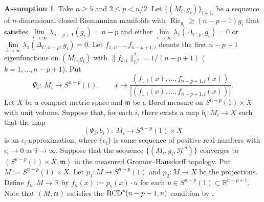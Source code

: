 \documentclass[pdftex]{sigma}
\numberwithin{equation}{section}
\theoremstyle{definition}
\newtheorem{Asu}[Thm]{Assumption}
\newcommand{\Ric}{\operatorname{Ric}}
\newcommand{\R}{\mathbb{R}}
\newcommand{\mf}{\mathfrak{m}}
\newcommand{\RCD}{{\rm RCD}^\ast}
\newcommand{\nHa}{\underline{\mathcal{H}}}
\begin{document}
\begin{Asu}\label{convX}
Take $n\geq 5$ and $2\leq p < n/2$.
Let $\{(M_i,g_i)\}_{i\in\mathbb{N}}$ be a sequence of $n$-dimen\-sional closed Riemannian manifolds with $\Ric_{g_i}\geq (n-p-1)g_i$ that satisfies $\lim\limits_{i\to\infty}\lambda_{n-p+1}(g_i)=n-p$ and either $\lim\limits_{i\to \infty}\lambda_1(\Delta_{C,p},g_i)=0$ or $\lim\limits_{i\to \infty}\lambda_1(\Delta_{C,n-p},g_i)=0$.
Let $f_{1,i},\ldots,f_{n-p+1,i}$ denote the first $n-p+1$ eigenfunctions on $(M_i,g_i)$ with $\|f_{k,i}\|_{L^2}^2=1/(n-p+1)$ ($k=1,\ldots,n-p+1$).
Put
\[
\Psi_i\colon\  M_i\to S^{n-p}(1),\qquad
x\mapsto \frac{(f_{1,i}(x),\ldots,f_{n-p+1,i}(x))}{|(f_{1,i}(x),\ldots,f_{n-p+1,i}(x))|}.
\]
Let $X$ be a compact metric space and $\mf$ be a Borel measure on $S^{n-p}(1)\times X$
with unit volume.
Suppose that, for each $i$, there exists a map $b_i\colon M_i\to X$ such that
the map
\[
(\Psi_i,b_i)\colon\ M_i\to S^{n-p}(1)\times X
\]
is an $\epsilon_i$-approximation, where $\{\epsilon_i\}$ is some sequence of positive real numbers with $\epsilon_i\to 0$ as $i\to \infty$.
Suppose that the sequence $\{(M_i,g_i, \nHa^n)\}$ converges to $(S^{n-p}(1)\times X,\mf)$ in the measured Gromov--Hausdorff topology.
Put $M:=S^{n-p}(1)\times X$.
Let
$p_1\colon M\to S^{n-p}(1)$ and $p_2\colon M\to X$ be the projections.
Define
$f_u\colon M\to\R$ by $f_u(x):=p_1(x)\cdot u$ for each $u\in S^{n-p}(1)\subset \R^{n-p+1}$.
Note that $(M,\mf)$ satisfies the $\RCD(n-p-1,n)$ condition by \cite[Theorem~3.22]{EKS}.
\end{Asu}
\end{document}
